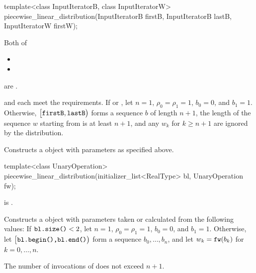 \begin{itemdecl}
template<class InputIteratorB, class InputIteratorW>
 piecewise_linear_distribution(InputIteratorB firstB, InputIteratorB lastB,
                               InputIteratorW firstW);
\end{itemdecl}

\begin{itemdescr}
\pnum
\mandates
Both of
\begin{itemize}
\item{}
\item{}
\end{itemize}
are .

\pnum
\expects
   and 
   each meet the
   requirements.
 If 
 or ,
 let $n = 1$,
     $\rho_0 = \rho_1 = 1$,
     $b_0 = 0$,
 and $b_1 = 1$.
 Otherwise,
 $\bigl[\texttt{\protect firstB}, \texttt{\protect lastB}\bigr)$
 forms a sequence $b$ of length $n+1$,
 the length of the sequence $w$ starting from 
 is at least $n+1$,
 and any $w_k$ for $k \geq n + 1$ are ignored by the distribution.

\pnum
\effects
Constructs a  object
 with parameters as specified above.
\end{itemdescr}


%
\begin{itemdecl}
template<class UnaryOperation>
 piecewise_linear_distribution(initializer_list<RealType> bl, UnaryOperation fw);
\end{itemdecl}

\begin{itemdescr}
\pnum
\mandates
{} is .

\pnum
\effects
Constructs a  object
 with parameters taken or calculated
 from the following values:
 If $\texttt{\protect bl.size()} < 2$,
 let $n = 1$,
     $\rho_0 = \rho_1 = 1$,
     $b_0 = 0$,
 and $b_1 = 1$.
 Otherwise,
 let $\bigl[\texttt{\protect bl.begin(),} \texttt{\protect bl.end()}\bigr)$
 form a sequence $b_0, \dotsc, b_n$,
 and
 let $w_k = \texttt{\protect fw}(b_k)$
 for $k = 0, \dotsc, n$.

\pnum
\complexity
The number of invocations of  does not exceed $n+1$.
\end{itemdescr}


